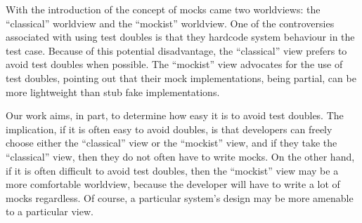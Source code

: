 With the introduction of the concept of mocks came two worldviews: the ``classical'' worldview and the ``mockist'' worldview.
One of the controversies associated with using test doubles is that they hardcode system behaviour in the test case. Because of this potential disadvantage, the ``classical'' view prefers to avoid test doubles when possible. The ``mockist'' view advocates for the use of test doubles, pointing out that their mock implementations, being partial, can be more lightweight than stub fake implementations.


Our work aims, in part, to determine how easy it is to avoid test doubles. The implication, if it is often easy to avoid doubles, is that developers can freely choose either the ``classical'' view or the ``mockist'' view, and if they take the ``classical'' view, then they do not often have to write mocks. On the other hand, if it is often difficult to avoid test doubles, then the ``mockist'' view may be a more comfortable worldview, because the developer will have to write a lot of mocks regardless. Of course, a particular system's design may be more amenable to a particular view.



